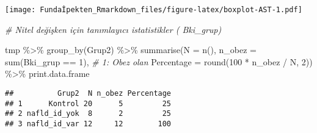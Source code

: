 \documentclass[
]{article}
\newenvironment{Shaded}{\begin{snugshade}}{\end{snugshade}}
\newcommand{\AttributeTok}[1]{\textcolor[rgb]{0.77,0.63,0.00}{#1}}
\newcommand{\CommentTok}[1]{\textcolor[rgb]{0.56,0.35,0.01}{\textit{#1}}}
\newcommand{\DecValTok}[1]{\textcolor[rgb]{0.00,0.00,0.81}{#1}}
\newcommand{\FunctionTok}[1]{\textcolor[rgb]{0.00,0.00,0.00}{#1}}
\newcommand{\NormalTok}[1]{#1}
\newcommand{\SpecialCharTok}[1]{\textcolor[rgb]{0.00,0.00,0.00}{#1}}
\begin{document}
\texttt{[image: Fundaİpekten\_Rmarkdown\_files/figure-latex/boxplot-AST-1.pdf]}

\par\medskip

\begin{Shaded}
\begin{Highlighting}[]
\CommentTok{\# Nitel değişken için tanımlayıcı istatistikler ( Bki\_grup)}

\NormalTok{tmp }\SpecialCharTok{\%\textgreater{}\%}
  \FunctionTok{group\_by}\NormalTok{(Grup2) }\SpecialCharTok{\%\textgreater{}\%}
  \FunctionTok{summarise}\NormalTok{(}\AttributeTok{N =} \FunctionTok{n}\NormalTok{(), }\AttributeTok{n\_obez =} \FunctionTok{sum}\NormalTok{(Bki\_grup }\SpecialCharTok{==} \DecValTok{1}\NormalTok{),    }\CommentTok{\# 1: Obez olan}
            \AttributeTok{Percentage =} \FunctionTok{round}\NormalTok{(}\DecValTok{100} \SpecialCharTok{*}\NormalTok{ n\_obez }\SpecialCharTok{/}\NormalTok{ N, }\DecValTok{2}\NormalTok{)) }\SpecialCharTok{\%\textgreater{}\%}
\NormalTok{print.data.frame}
\end{Highlighting}
\end{Shaded}

\begin{verbatim}
##          Grup2  N n_obez Percentage
## 1      Kontrol 20      5         25
## 2 nafld_id_yok  8      2         25
## 3 nafld_id_var 12     12        100
\end{verbatim}

\par\medskip
\end{document}
